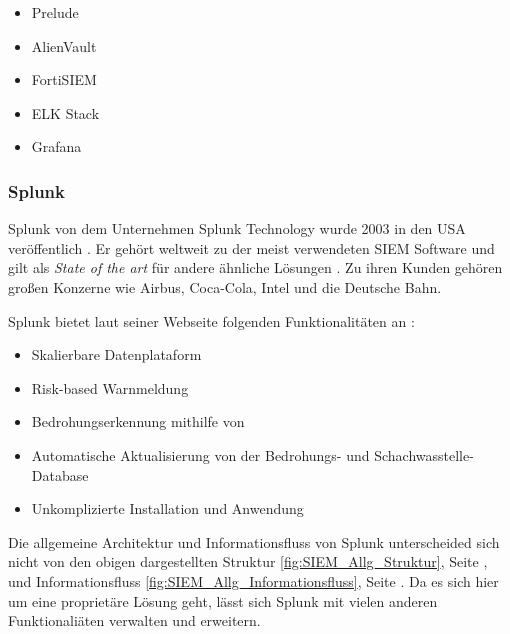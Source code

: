 \begin{itemize}[noitemsep]
   \item Prelude %
   \item AlienVault  %
   \item FortiSIEM %
   \item ELK Stack %
   \item Grafana %
\end{itemize}


\newpage
\subsubsection{Splunk}
Splunk von dem Unternehmen Splunk Technology wurde 2003 in den USA veröffentlich \citep{Splunk_splunk}. Er gehört weltweit zu der meist verwendeten \gls{SIEM} Software und gilt als \textit{State of the art} für andere ähnliche Lösungen \citep{Kazarov_Splunk}. Zu ihren Kunden gehören großen Konzerne wie Airbus, Coca-Cola, Intel und die Deutsche Bahn.

Splunk bietet laut seiner Webseite folgenden Funktionalitäten an \citep{Splunk_SPE}:

\begin{itemize}[noitemsep]
   \item Skalierbare Datenplataform
   \item Risk-based Warnmeldung 
   \item Bedrohungserkennung mithilfe von 
   \item Automatische Aktualisierung von der Bedrohungs- und Schachwasstelle-Database  
   \item Unkomplizierte Installation und Anwendung
\end{itemize}

Die allgemeine Architektur und Informationsfluss von Splunk unterscheided sich nicht von den obigen dargestellten Struktur \ref{fig:SIEM_Allg_Struktur}, Seite \pageref{fig:SIEM_Allg_Struktur}, und Informationsfluss \ref{fig:SIEM_Allg_Informationsfluss}, Seite \pageref{fig:SIEM_Allg_Informationsfluss}. Da es sich hier um eine proprietäre Lösung geht, lässt sich Splunk mit vielen anderen Funktionaliäten verwalten und erweitern. 

